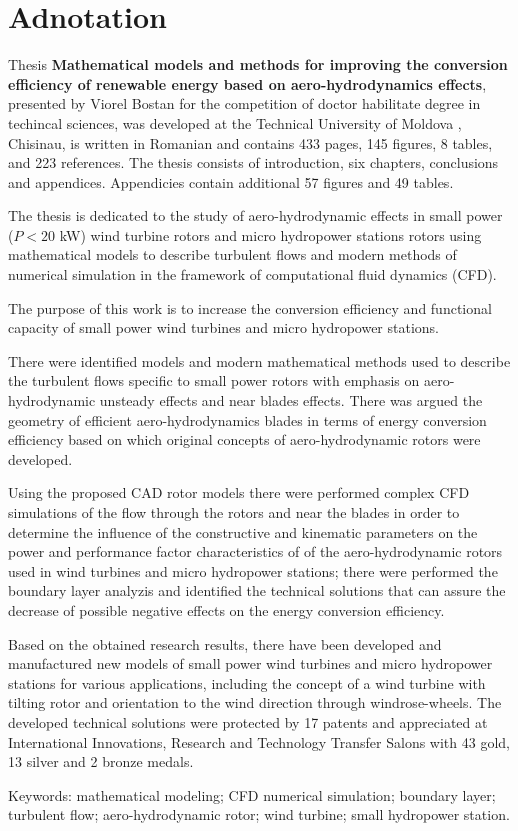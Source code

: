 \section*{Adnotation}

Thesis {\bf Mathematical models and methods for improving the conversion efficiency of renewable energy based on aero-hydrodynamics effects}, presented by Viorel Bostan for the competition of doctor habilitate degree in techincal sciences, was developed at the Technical University of Moldova , Chisinau, is written in Romanian and contains 433 pages, 145 figures, 8 tables, and 223 references. The thesis consists of introduction, six chapters, conclusions and appendices. Appendicies contain additional 57 figures and 49 tables.

The thesis is dedicated to the study of aero-hydrodynamic effects in small power ($P<20$ kW) wind turbine rotors and micro hydropower stations rotors using mathematical models to describe turbulent flows and modern methods of numerical simulation in the framework of computational fluid dynamics (CFD).

The purpose of this work is to increase the conversion efficiency and functional capacity of small power wind turbines and micro hydropower stations.

There were identified models and modern mathematical methods used to describe the turbulent flows specific to small power rotors with emphasis on aero-hydrodynamic unsteady effects and near blades effects. There was argued the geometry of efficient aero-hydrodynamics blades  in terms of energy conversion efficiency based on which original concepts of aero-hydrodynamic rotors were developed.

Using the proposed CAD rotor models there were performed complex  CFD simulations of the flow through the rotors and near the blades  in order to determine the influence of the constructive and  kinematic parameters on the power and performance factor characteristics of  of the aero-hydrodynamic rotors used in wind turbines and micro hydropower stations; there were performed the boundary layer analyzis and identified the technical solutions that can assure the decrease of possible negative effects on the energy conversion efficiency.

Based on the obtained research results, there have been developed and manufactured new models of small power wind turbines and micro hydropower stations for various applications, including the concept of a wind turbine with tilting rotor and orientation to the wind direction through windrose-wheels. The developed technical solutions were protected by 17 patents and appreciated at International Innovations, Research and Technology Transfer Salons  with 43 ​​gold, 13 silver and 2 bronze medals.

Keywords: mathematical modeling; CFD numerical simulation; boundary layer; turbulent flow; aero-hydrodynamic rotor; wind turbine; small hydropower station.
